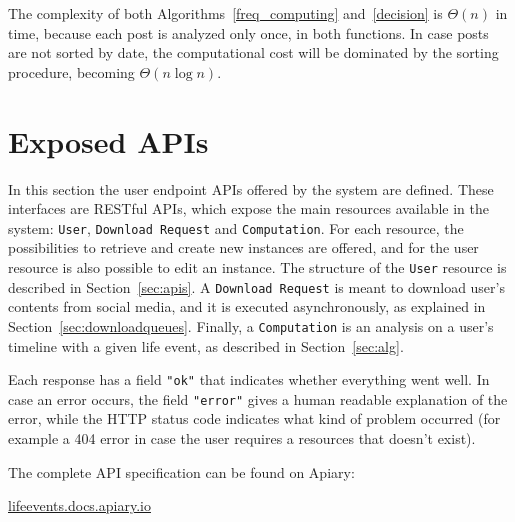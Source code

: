 The complexity of both Algorithms~\ref{freq_computing} and~\ref{decision} is $\Theta(n)$ in time, because each post is analyzed only once, in both functions. In case posts are not sorted by date, the computational cost will be dominated by the sorting procedure, becoming $\Theta(n \log n)$.

\section{Exposed APIs}
\label{sec:APIs}

In this section the user endpoint APIs offered by the system are defined. These interfaces are RESTful APIs, which expose the main resources available in the system: \texttt{User}, \texttt{Download Request} and \texttt{Computation}. For each resource, the possibilities to retrieve and create new instances are offered, and for the user resource is also possible to edit an instance. The structure of the \texttt{User} resource is described in Section~\ref{sec:apis}. A \texttt{Download Request} is meant to download user's contents from social media, and it is executed asynchronously, as explained in Section~\ref{sec:downloadqueues}. Finally, a \texttt{Computation} is an analysis on a user's timeline with a given life event, as described in Section~\ref{sec:alg}.

Each response has a field \texttt{"ok"} that indicates whether everything went well. In case an error occurs, the field \texttt{"error"} gives a human readable explanation of the error, while the HTTP status code indicates what kind of problem occurred (for example a 404 error in case the user requires a resources that doesn't exist).

The complete API specification can be found on Apiary:
\begin{center}
\url{lifeevents.docs.apiary.io}
\end{center}

